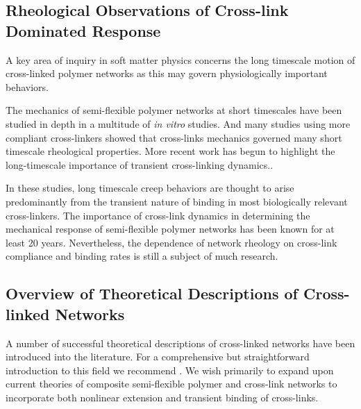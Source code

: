 \documentclass[pre,reprint]{revtex4-1}
\begin{document}
\subsection{Rheological Observations of Cross-link Dominated Response}

A key area of inquiry in soft matter physics concerns the long timescale motion of cross-linked polymer networks as this may govern physiologically important behaviors\cite{cell_rheo}. 

The mechanics of semi-flexible polymer networks at short timescales have been studied in depth in a multitude of {\em in vitro} studies\cite{rheo_actingel,rheo_bench,rheo_marge}.  And many studies using more compliant cross-linkers showed that cross-links mechanics governed many short timescale rheological properties\cite{rheo_crosslink_nonlin1,rheo_crosslink_nonlin2,rheo_crosslink_nonlin3,rheo_crosslink_notactin,rheo_crosslinkcompare,rheo_crosslinkreview}.  More recent work has begun to highlight the long-timescale importance of transient cross-linking dynamics.\cite{rheo_crosslinkslip1,rheo_crosslinkslip2,rheo_crosslinkslip3,rheo_nonaffine}.

In these studies, long timescale creep behaviors are thought to arise predominantly from the transient nature of binding in most biologically relevant cross-linkers\cite{rheo_crosslinkslip2}.  The importance of cross-link dynamics in determining the mechanical response of semi-flexible polymer networks has been known for at least 20 years\cite{rheo_crosslinksmatter}.  Nevertheless, the dependence of network rheology on cross-link compliance and binding rates is still a subject of much research\cite{theo_crosslinkslip2}.  

\subsection{Overview of Theoretical Descriptions of Cross-linked Networks}
A number of successful theoretical descriptions of cross-linked networks have been introduced into the literature\cite{theo_hlm,theo_best,theo_nonaffine2,theo_floppy,theo_crosslinknonlinear}.  For a comprehensive but straightforward introduction to this field we recommend \cite{megareview}.  We wish primarily to expand upon current theories of composite semi-flexible polymer and cross-link networks to incorporate both nonlinear extension and transient binding of cross-links.  
\end{document}
